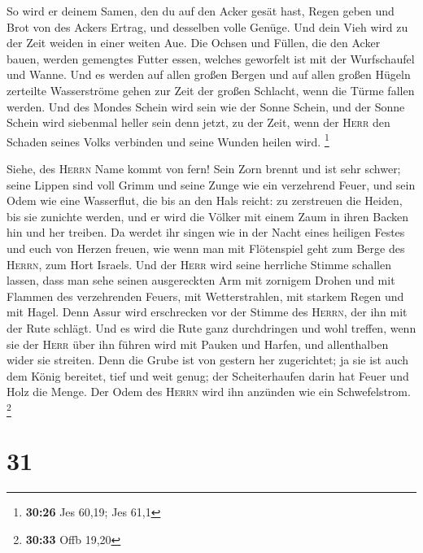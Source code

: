  So wird er deinem Samen, den du auf den Acker gesät
hast, Regen geben und Brot von des Ackers Ertrag, und desselben volle
Genüge. Und dein Vieh wird zu der Zeit weiden in einer weiten Aue.
 Die Ochsen und Füllen, die den Acker bauen, werden
gemengtes Futter essen, welches geworfelt ist mit der Wurfschaufel und
Wanne.  Und es werden auf allen großen Bergen und auf
allen großen Hügeln zerteilte Wasserströme gehen zur Zeit der großen
Schlacht, wenn die Türme fallen werden.  Und des Mondes
Schein wird sein wie der Sonne Schein, und der Sonne Schein wird
siebenmal heller sein denn jetzt, zu der Zeit, wenn der \textsc{Herr}
den Schaden seines Volks verbinden und seine Wunden heilen wird.
\footnote{\textbf{30:26} Jes 60,19; Jes 61,1}

 Siehe, des \textsc{Herrn} Name kommt von fern! Sein Zorn
brennt und ist sehr schwer; seine Lippen sind voll Grimm und seine Zunge
wie ein verzehrend Feuer,  und sein Odem wie eine
Wasserflut, die bis an den Hals reicht: zu zerstreuen die Heiden, bis
sie zunichte werden, und er wird die Völker mit einem Zaum in ihren
Backen hin und her treiben.  Da werdet ihr singen wie in
der Nacht eines heiligen Festes und euch von Herzen freuen, wie wenn man
mit Flötenspiel geht zum Berge des \textsc{Herrn}, zum Hort Israels.
 Und der \textsc{Herr} wird seine herrliche Stimme
schallen lassen, dass man sehe seinen ausgereckten Arm mit zornigem
Drohen und mit Flammen des verzehrenden Feuers, mit Wetterstrahlen, mit
starkem Regen und mit Hagel.  Denn Assur wird erschrecken
vor der Stimme des \textsc{Herrn}, der ihn mit der Rute schlägt.
 Und es wird die Rute ganz durchdringen und wohl treffen,
wenn sie der \textsc{Herr} über ihn führen wird mit Pauken und Harfen,
und allenthalben wider sie streiten.  Denn die Grube ist
von gestern her zugerichtet; ja sie ist auch dem König bereitet, tief
und weit genug; der Scheiterhaufen darin hat Feuer und Holz die Menge.
Der Odem des \textsc{Herrn} wird ihn anzünden wie ein Schwefelstrom.
\footnote{\textbf{30:33} Offb 19,20}

\hypertarget{section-12}{%
\section{31}\label{section-12}}

